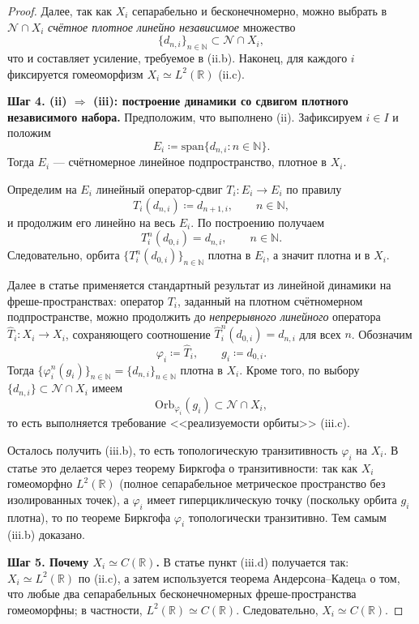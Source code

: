 \documentclass[../NDCNNAI_main.tex]{subfiles}
\begin{document}
\begin{proof}
Далее, так как $X_i$ сепарабельно и бесконечномерно, можно выбрать в $\mathcal{N}\cap X_i$
\emph{счётное плотное линейно независимое} множество
\[
\{d_{n,i}\}_{n\in\mathbb{N}}\subset \mathcal{N}\cap X_i,
\]
что и составляет усиление, требуемое в (ii.b).
Наконец, для каждого $i$ фиксируется гомеоморфизм $X_i\simeq L^2(\mathbb{R})$ (ii.c).

\noindent\textbf{Шаг 4. (ii) $\Rightarrow$ (iii): построение динамики со сдвигом плотного независимого набора.}
Предположим, что выполнено (ii). Зафиксируем $i\in I$ и положим
\[
E_i \coloneq \mathrm{span}\{d_{n,i}:n\in\mathbb{N}\}.
\]
Тогда $E_i$ --- счётномерное линейное подпространство, плотное в $X_i$.

Определим на $E_i$ линейный оператор-сдвиг $T_i\colon E_i\to E_i$ по правилу
\[
T_i(d_{n,i}) \coloneq d_{n+1,i},\qquad n\in\mathbb{N},
\]
и продолжим его линейно на весь $E_i$. По построению получаем
\[
T_i^n(d_{0,i}) = d_{n,i},\qquad n\in\mathbb{N}.
\]
Следовательно, орбита $\{T_i^n(d_{0,i})\}_{n\in\mathbb{N}}$ плотна в $E_i$, а значит
плотна и в $X_i$.

Далее в статье применяется стандартный результат из линейной динамики на фреше-пространствах:
оператор $T_i$, заданный на плотном счётномерном подпространстве, можно продолжить
до \emph{непрерывного линейного} оператора $\widehat{T}_i\colon X_i\to X_i$, сохраняющего соотношение
$\widehat{T}_i^n(d_{0,i})=d_{n,i}$ для всех $n$. Обозначим
\[
\varphi_i \coloneq \widehat{T}_i,\qquad g_i \coloneq d_{0,i}.
\]
Тогда $\{\varphi_i^n(g_i)\}_{n\in\mathbb{N}}=\{d_{n,i}\}_{n\in\mathbb{N}}$ плотна в $X_i$.
Кроме того, по выбору $\{d_{n,i}\}\subset \mathcal{N}\cap X_i$ имеем
\[
\mathrm{Orb}_{\varphi_i}(g_i) \subset \mathcal{N}\cap X_i,
\]
то есть выполняется требование <<реализуемости орбиты>> (iii.c).

Осталось получить (iii.b), то есть топологическую транзитивность $\varphi_i$ на $X_i$.
В статье это делается через теорему Биркгофа о транзитивности: так как $X_i$
гомеоморфно $L^2(\mathbb{R})$ (полное сепарабельное метрическое пространство без
изолированных точек), а $\varphi_i$ имеет гиперциклическую точку (поскольку
орбита $g_i$ плотна), то по теореме Биркгофа $\varphi_i$ топологически транзитивно.
Тем самым (iii.b) доказано.

\noindent\textbf{Шаг 5. Почему $X_i\simeq C(\mathbb{R})$.}
В статье пункт (iii.d) получается так: $X_i\simeq L^2(\mathbb{R})$ по (ii.c), а затем
используется теорема Андерсона--Кадецa о том, что любые два сепарабельных
бесконечномерных фреше-пространства гомеоморфны; в частности,
$L^2(\mathbb{R}) \simeq C(\mathbb{R})$. Следовательно, $X_i\simeq C(\mathbb{R})$.


\end{proof}
\end{document}
